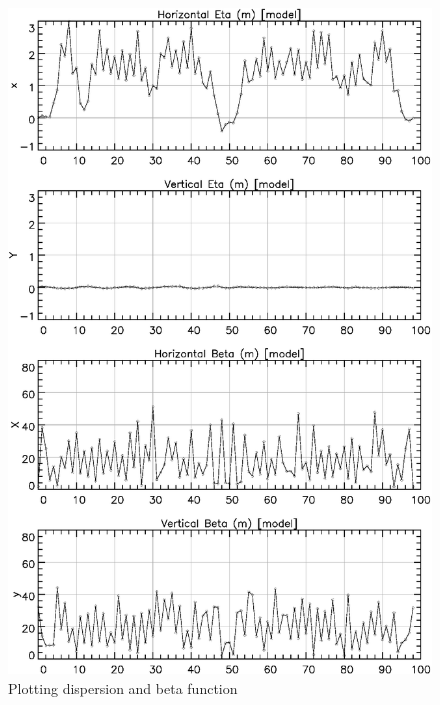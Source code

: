 \begin{figure}
  \centering
  \includegraphics[width=5in]{plot-eta-beta.eps}
  \caption{Plotting dispersion and beta function}
  \label{f:plot.eta.beta}
\end{figure}

